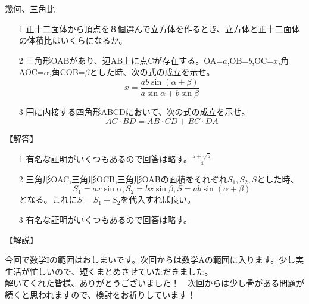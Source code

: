 \documentclass[a4paper,fleqn,dvipdfmx]{jsarticle}
\begin{document}
\newpage

\begin{itembox}[l]{幾何、三角比}

\begin{itemize}
    \item [1] 
    正十二面体から頂点を８個選んで立方体を作るとき、立方体と正十二面体の体積比はいくらになるか。
    \item [2] 
    三角形OABがあり、辺AB上に点Cが存在する。OA=$a$,OB=$b$,OC=$x$,角AOC=$\alpha$,角COB=$\beta$とした時、次の式の成立を示せ。
    $$x=\frac{ab\sin(\alpha+\beta)}{a\sin\alpha + b\sin\beta}$$
    \item [3] 
    円に内接する四角形ABCDにおいて、次の式の成立を示せ。
    $$AC\cdot BD=AB\cdot CD + BC\cdot DA$$
\end{itemize}

\end{itembox}


\begin{flushleft}
【解答】
\end{flushleft}

\begin{itemize}
    \item [1] 
    有名な証明がいくつもあるので回答は略す。$\frac{5+\sqrt{5}}{4}$
    
    \item [2]
    三角形OAC,三角形OCB,三角形OABの面積をそれぞれ$S_1,S_2,S$とした時、
    $$S_1=ax\sin\alpha,S_2=bx\sin\beta,S=ab\sin(\alpha+\beta)$$
    となる。これに$S=S_1+S_2$を代入すれば良い。
    
    \item [3]
    有名な証明がいくつもあるので回答は略す。
    
\end{itemize}


\begin{flushleft}
【解説】
\end{flushleft}

今回で数学Iの範囲はおしまいです。次回からは数学Aの範囲に入ります。少し実生活が忙しいので、短くまとめさせていただきました。\\
解いてくれた皆様、ありがとうございました！　次回からは少し骨がある問題が続くと思われますので、検討をお祈りしています！
\end{document}
